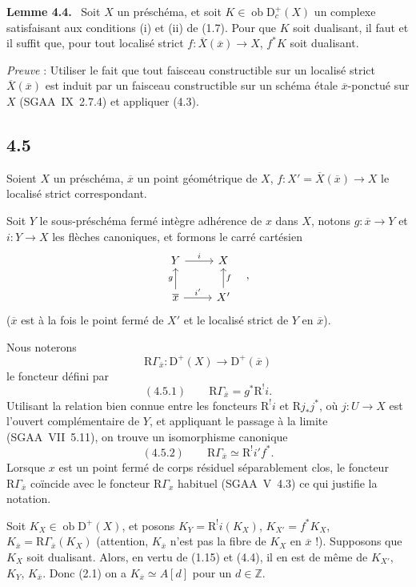 \documentclass[11pt]{article}
\newenvironment{statement}[1]{\par\medskip\noindent\textbf{#1.}\ }{\par\medskip}
\newcommand{\R}{\mathrm{R}}\newcommand{\RHomCore}{\mathrm{RHom}}
\newcommand{\D}{\mathrm{D}}
\newcommand{\Z}{\mathbb{Z}}
\newcommand{\ob}{\operatorname{ob}}
\newcommand{\ol}[1]{\overline{#1}}
\providecommand{\ob}{\operatorname{ob}}
\providecommand{\R}{\mathrm R}
\providecommand{\Z}{\mathbb Z}
\begin{document}
\begin{statement}{Lemme 4.4}
Soit $X$ un préschéma, et soit $K\in\ob\D_c^+(X)$ un complexe satisfaisant aux conditions (i) et (ii) de (1.7). Pour que $K$ soit dualisant, il faut et il suffit que, pour tout localisé strict $f:\ol{X}(\ol{x})\to X$, $f^*K$ soit dualisant.
\end{statement}

\emph{Preuve} : Utiliser le fait que tout faisceau constructible sur un localisé strict $\ol{X}(\ol{x})$ est induit par un faisceau constructible sur un schéma étale $\ol{x}$-ponctué sur $X$ (SGAA~IX~2.7.4) et appliquer (4.3).

\subsection*{4.5}
Soient $X$ un préschéma, $\ol{x}$ un point géométrique de $X$, $f:X'=\ol{X}(\ol{x})\to X$ le localisé strict correspondant.

Soit $Y$ le sous-préschéma fermé intègre adhérence de $x$ dans $X$, notons $g:\ol{x}\to Y$ et $i:Y\to X$ les flèches canoniques, et formons le carré cartésien
\[
\begin{tikzcd}
Y \arrow[r,"i"] & X \\
\ol{x} \arrow[u,"g"] \arrow[r,"i'"] & X' \arrow[u,"f"']
\end{tikzcd}\quad ,
\]
($\ol{x}$ est à la fois le point fermé de $X'$ et le localisé strict de $Y$ en $\ol{x}$).

Nous noterons
\[
\R\Gamma_{\ol{x}}:\D^+(X)\longrightarrow \D^+(\ol{x})
\]
le foncteur défini par
\[
(4.5.1)\qquad \R\Gamma_{\ol{x}}=g^*\R^{!}i.
\]
Utilisant la relation bien connue entre les foncteurs $\R^{!}i$ et $\R j_*j^*$, où $j:U\to X$ est l'ouvert complémentaire de $Y$, et appliquant le passage à la limite (SGAA~VII~5.11), on trouve un isomorphisme canonique
\[
(4.5.2)\qquad \R\Gamma_{\ol{x}}\simeq\R^{!}i' f^*.
\]
Lorsque $x$ est un point fermé de corps résiduel séparablement clos, le foncteur $\R\Gamma_{\ol{x}}$ coïncide avec le foncteur $\R\Gamma_x$ habituel (SGAA~V~4.3) ce qui justifie la notation.

Soit $K_X\in\ob\D^+(X)$, et posons $K_Y=\R^{!}i(K_X)$, $K_{X'}=f^*K_X$, $K_{\ol{x}}=\R\Gamma_{\ol{x}}(K_X)$ (attention, $K_{\ol{x}}$ n'est pas la fibre de $K_X$ en $\ol{x}$ !). Supposons que $K_X$ soit dualisant. Alors, en vertu de (1.15) et (4.4), il en est de même de $K_{X'}$, $K_Y$, $K_{\ol{x}}$. Donc (2.1) on a $K_{\ol{x}}\simeq A[d]$ pour un $d\in\Z$.
\end{document}
